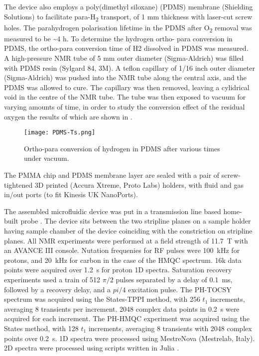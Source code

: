 The device also employs a poly(dimethyl siloxane) (PDMS) membrane
(Shielding Solutions) to facilitate para-H\textsubscript{2} transport,
of 1 mm thickness with laser-cut screw holes. The parahydrogen
polarisation lifetime in the PDMS after O\textsubscript{2} removal was
measured to be \textasciitilde{}4 h. To determine the hydrogen ortho- para
conversion in PDMS, the ortho-para conversion time of H2 dissolved in PDMS
was measured. A high-pressure NMR tube of 5 mm outer diameter
(Sigma-Aldrich) was filled with PDMS resin (Sylgard 84, 3M). A teflon
capillary of 1/16 inch outer diameter (Sigma-Aldrich) was pushed
into the NMR tube along the central axis, and the PDMS was allowed to cure.
The capillary was then removed, leaving a cylidrical void in the centre of
the NMR tube. The tube was then exposed to vacuum for varying amounts of
time, in order to study the conversion effect of the residual oxygen the
results of which are shown in .

\begin{figure}
  \texttt{[image: PDMS-Ts.png]}
  \caption{Ortho-para conversion of hydrogen in PDMS after various times
  under vacuum.}
  \label{fig:ph2conv}
\end{figure}

The PMMA chip and PDMS membrane layer are sealed with a pair of
screw-tightened 3D printed (Accura Xtreme, Proto Labs) holders, with
fluid and gas in/out ports (to fit Kinesis UK NanoPorts).

The assembled microfluidic device was put in a transmission line based
home-built probe \cite{RN164}. The
device sits between the two stripline planes on a sample holder having
sample chamber of the device coinciding with the constriction on
stripline planes. All NMR experiments were performed at a field strength
of 11.7~T with an AVANCE III console. Nutation frequenies for RF pulses
were 100~kHz for protons, and 20~kHz for carbon in the case of the HMQC
spectrum. 16k data points were acquired over 1.2~s for proton 1D spectra.
Saturation recovery experiments used a train of 512 $\pi/2$ pulses
separated by a delay of 0.1~ms, followed by a recovery delay, and a $pi/4$
excitation pulse.
The PH-TOCSY spectrum was acquired using the States-TPPI method,
with 256 $t_1$ increments, averaging 8 transients per increment.
2048 complex data points in 0.2~s were acquired for each increment.
The PH-HMQC experiment was acquired using the States method, with
128 $t_1$ increments, averaging 8 transients with 2048 complex points
over 0.2~s. 1D spectra were processed using MestreNova (Mestrelab, Italy).
2D spectra were processed using scripts written in Julia \cite{Bezanson:2017gd}.

